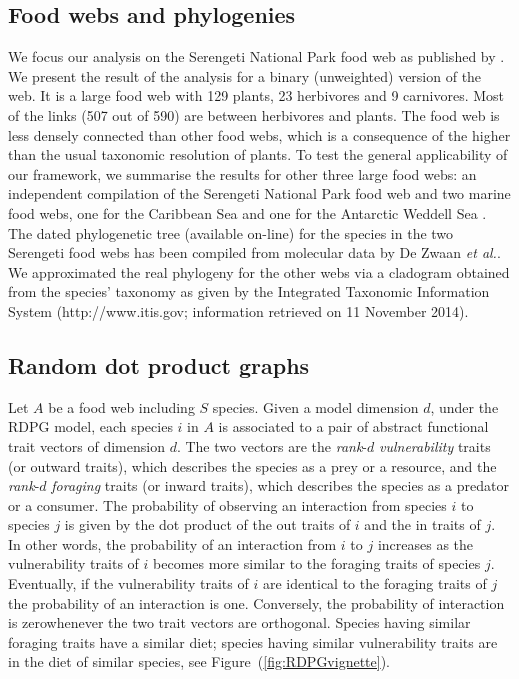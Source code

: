 \documentclass[]{rsos}%
\begin{document}
 \subsection{Food webs and phylogenies}
 We focus our analysis on the Serengeti National Park food web as published
 by \citet{baskerville2011spatial}. We present the result of the analysis for a binary
 (unweighted) version of the web. It is a large food web with 129
 plants, 23 herbivores and 9 carnivores. Most of the links (507 out of 590) are between
 herbivores and plants. The food web is less densely connected than other food webs, which is a
 consequence of the higher than the usual taxonomic resolution of plants. To
 test the general applicability of our framework, we
 summarise the results for other three large food webs:
 an independent compilation of the Serengeti National Park food web
 \citep{de2011serengeti} and two marine food webs, one for the Caribbean Sea
 \citep{opitz1996trophic} and one for the Antarctic Weddell Sea
 \citep{jennings2002long}. The dated phylogenetic tree (available on-line) for
 the species in the two Serengeti food webs has been compiled from molecular
 data by De Zwaan \emph{et al.}. We approximated the real phylogeny for the
 other webs via a cladogram obtained from the species' taxonomy as given by the
 Integrated Taxonomic Information System (http://www.itis.gov; information retrieved on 11 November 2014).

\subsection{Random dot product graphs}\label{subsec:method_rdpg}

Let $A$ be a food web including $S$ species.
Given a model dimension $d$, under the RDPG model, each species $i$ in $A$
is associated to a pair of abstract functional trait vectors of dimension $d$.
The two vectors are the \emph{rank}-$d$ \emph{vulnerability} traits (or outward traits), which describes the
species as a prey or a resource, and the \emph{rank}-$d$ \emph{foraging} traits (or inward
traits), which describes the species as a predator or a consumer. The probability of observing an
interaction from species $i$ to species $j$ is given by the dot product of the
out traits of $i$ and the in traits of $j$. In other words, the probability of an interaction from $i$ to
$j$ increases as the vulnerability traits of $i$ becomes more similar to the foraging traits of species $j$.
Eventually, if the vulnerability traits of $i$ are identical to the foraging traits of $j$ the probability of an
interaction is one. Conversely, the probability of interaction is zerowhenever the two trait vectors are
orthogonal. Species having similar foraging traits have a similar diet; species having similar vulnerability
traits are in the diet of similar species, see Figure~(\ref{fig:RDPGvignette}).
\end{document}
